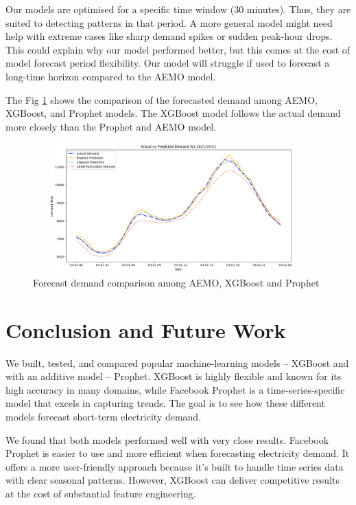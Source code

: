 \documentclass[mstat,12pt]{unswthesis}
\begin{document}
Our models are optimised for a specific time window (30 minutes). Thus,
they are suited to detecting patterns in that period. A more general
model might need help with extreme cases like sharp demand spikes or
sudden peak-hour drops. This could explain why our model performed
better, but this comes at the cost of model forecast period flexibility.
Our model will struggle if used to forecast a long-time horizon compared
to the AEMO model.

The Fig \ref{AEMO_Prophet_XGBoost} shows the comparison of the
forecasted demand among AEMO, XGBoost, and Prophet models. The XGBoost
model follows the actual demand more closely than the Prophet and AEMO
model.

\begin{figure}[H]
\centering
\includegraphics[width=0.95\textwidth, height=5cm]{AEMO_Prophet_XGBoost.png}
\caption{Forecast demand comparison among AEMO, XGBoost and Prophet}\label{AEMO_Prophet_XGBoost}
\end{figure}

\chapter{Conclusion and Future Work}\label{conclusion-and-future-work}

We built, tested, and compared popular machine-learning models --
XGBoost and with an additive model -- Prophet. XGBoost is highly
flexible and known for its high accuracy in many domains, while Facebook
Prophet is a time-series-specific model that excels in capturing trends.
The goal is to see how these different models forecast short-term
electricity demand.

We found that both models performed well with very close results.
Facebook Prophet is easier to use and more efficient when forecasting
electricity demand. It offers a more user-friendly approach because it's
built to handle time series data with clear seasonal patterns. However,
XGBoost can deliver competitive results at the cost of substantial
feature engineering.
\end{document}
